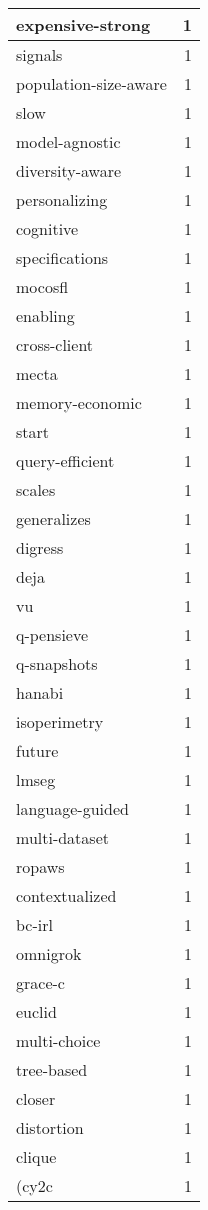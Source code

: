 \begin{table}[h]
\begin{tabular}{|l|r|}
\hline
expensive-strong & 1 \\
\hline
signals & 1 \\
\hline
population-size-aware & 1 \\
\hline
slow & 1 \\
\hline
model-agnostic & 1 \\
\hline
diversity-aware & 1 \\
\hline
personalizing & 1 \\
\hline
cognitive & 1 \\
\hline
specifications & 1 \\
\hline
mocosfl & 1 \\
\hline
enabling & 1 \\
\hline
cross-client & 1 \\
\hline
mecta & 1 \\
\hline
memory-economic & 1 \\
\hline
start & 1 \\
\hline
query-efficient & 1 \\
\hline
scales & 1 \\
\hline
generalizes & 1 \\
\hline
digress & 1 \\
\hline
deja & 1 \\
\hline
vu & 1 \\
\hline
q-pensieve & 1 \\
\hline
q-snapshots & 1 \\
\hline
hanabi & 1 \\
\hline
isoperimetry & 1 \\
\hline
future & 1 \\
\hline
lmseg & 1 \\
\hline
language-guided & 1 \\
\hline
multi-dataset & 1 \\
\hline
ropaws & 1 \\
\hline
contextualized & 1 \\
\hline
bc-irl & 1 \\
\hline
omnigrok & 1 \\
\hline
grace-c & 1 \\
\hline
euclid & 1 \\
\hline
multi-choice & 1 \\
\hline
tree-based & 1 \\
\hline
closer & 1 \\
\hline
distortion & 1 \\
\hline
clique & 1 \\
\hline
(cy2c & 1 \\

\end{tabular}
\end{table}
